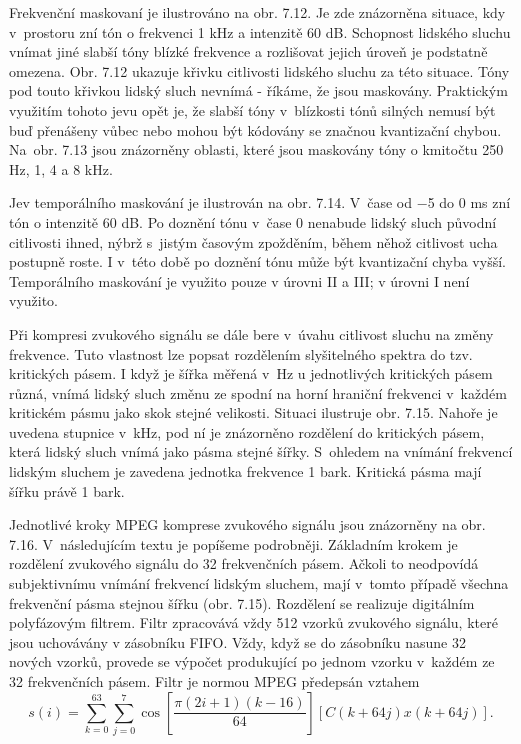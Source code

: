 \noindent 

\noindent 

\noindent 

\noindent Frekvenční maskovaní je ilustrováno na obr. 7.12. Je zde znázorněna situace, kdy v~prostoru zní tón o frekvenci 1 kHz a intenzitě 60 dB. Schopnost lidského sluchu vnímat jiné slabší tóny blízké frekvence a rozlišovat jejich úroveň je podstatně omezena. Obr. 7.12 ukazuje křivku citlivosti lidského sluchu za této situace. Tóny pod touto křivkou lidský sluch nevnímá - říkáme, že jsou maskovány. Praktickým využitím tohoto jevu opět je, že slabší tóny v~blízkosti tónů silných nemusí být buď přenášeny vůbec nebo mohou být kódovány se značnou kvantizační chybou. Na~obr. 7.13 jsou znázorněny oblasti, které jsou maskovány tóny o kmitočtu 250 Hz, 1, 4 a 8 kHz.

\noindent 

\noindent Jev temporálního maskování je ilustrován na obr. 7.14. V~čase od $-$5 do 0 ms zní tón o intenzitě 60 dB. Po doznění tónu v~čase 0 nenabude lidský sluch původní citlivosti ihned, nýbrž s~jistým časovým zpožděním, během něhož citlivost ucha postupně roste. I v~této době po doznění tónu může být kvantizační chyba vyšší. Temporálního maskování je využito pouze v úrovni II a III; v úrovni I není využito.

\noindent 

\noindent 

\noindent Při kompresi zvukového signálu se dále bere v~úvahu citlivost sluchu na změny frekvence. Tuto vlastnost lze popsat rozdělením slyšitelného spektra do tzv. kritických pásem. I když je šířka měřená v~Hz u jednotlivých kritických pásem různá, vnímá lidský sluch změnu ze spodní na horní hraniční frekvenci v~každém kritickém pásmu jako skok stejné velikosti. Situaci ilustruje obr. 7.15. Nahoře je uvedena stupnice v~kHz, pod ní je znázorněno rozdělení do kritických pásem, která lidský sluch vnímá jako pásma stejné šířky. S~ohledem na vnímání frekvencí lidským sluchem je zavedena jednotka frekvence 1 bark. Kritická pásma mají šířku právě 1 bark.

\noindent  

\noindent Jednotlivé kroky MPEG komprese zvukového signálu jsou znázorněny na obr. 7.16. V~následujícím textu je popíšeme podrobněji. Základním krokem je rozdělení zvukového signálu do 32 frekvenčních pásem. Ačkoli to neodpovídá subjektivnímu vnímání frekvencí lidským sluchem, mají v~tomto případě všechna frekvenční pásma stejnou šířku (obr. 7.15). Rozdělení se realizuje digitálním polyfázovým filtrem. Filtr zpracovává vždy 512 vzorků zvukového signálu, které jsou uchovávány v zásobníku FIFO. Vždy, když se do zásobníku nasune 32 nových vzorků, provede se výpočet produkující po jednom vzorku v~každém ze 32 frekvenčních pásem. Filtr je normou MPEG předepsán vztahem 
\begin{equation} \label{GrindEQ__7_9_} 
s\left(i\right)=\sum _{k=0}^{63}\sum _{j=0}^{7}\cos \left[\frac{\pi \left(2i+1\right)\left(k-16\right)}{64} \right]\left[C\left(k+64j\right)x\left(k+64j\right)\right]  .  
\end{equation} 


